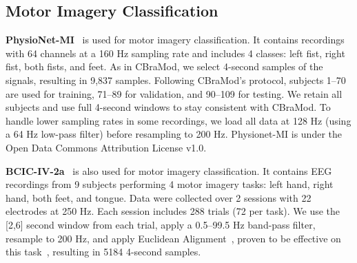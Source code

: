 \documentclass{article}
\begin{document}
\subsection{Motor Imagery Classification}


\textbf{PhysioNet-MI}~\citep{goldberger2000physiobank} is used for motor imagery classification. It contains recordings with 64 channels at a 160 Hz sampling rate and includes 4 classes: left fist, right fist, both fists, and feet. As in CBraMod, we select 4-second samples of the signals, resulting in 9,837 samples. Following CBraMod's protocol, subjects 1–70 are used for training, 71–89 for validation, and 90–109 for testing. We retain all subjects and use full 4-second windows to stay consistent with CBraMod. To handle lower sampling rates in some recordings, we load all data at 128 Hz (using a 64 Hz low-pass filter) before resampling to 200 Hz. Physionet-MI is under the Open Data Commons Attribution License v1.0.

\textbf{BCIC-IV-2a}~\citep{tangermann2012review} is also used for motor imagery classification. It contains EEG recordings from 9 subjects performing 4 motor imagery tasks: left hand, right hand, both feet, and tongue. Data were collected over 2 sessions with 22 electrodes at 250 Hz. Each session includes 288 trials (72 per task). We use the [2,6] second window from each trial, apply a 0.5–99.5 Hz band-pass filter, resample to 200 Hz, and apply Euclidean Alignment~\citep{he2019transfer}, proven to be effective on this task~\citep{el2024strong}, resulting in 5184 4-second samples. 
\end{document}
